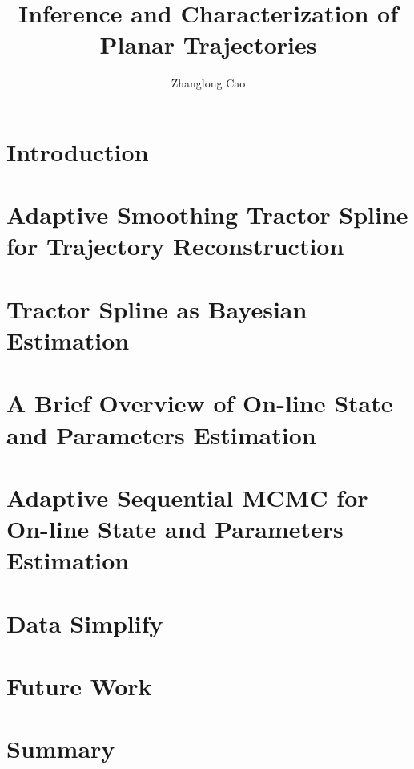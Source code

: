 \documentclass[12pt,twoside]{report}
\title{Inference and Characterization of Planar Trajectories}
\author{Zhanglong Cao}
\date{}
\begin{document}
\frontstuff

\linespread{1.3} \normalsize


\chapter{Introduction}

\clearemptydoublepage

\chapter{Adaptive Smoothing Tractor Spline for Trajectory Reconstruction}

\clearemptydoublepage

\chapter{Tractor Spline as Bayesian Estimation}

\clearemptydoublepage

\chapter{A Brief Overview of On-line State and Parameters Estimation}

\clearemptydoublepage

\chapter{Adaptive Sequential MCMC for On-line State and Parameters Estimation}

\clearemptydoublepage

\chapter{Data Simplify}

\clearemptydoublepage


\chapter{Future Work}

\clearemptydoublepage


\chapter{Summary}

\clearemptydoublepage
\end{document}
